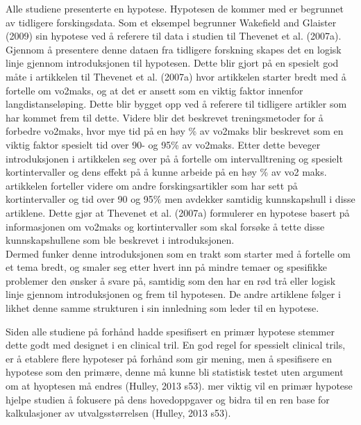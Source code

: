 \documentclass[
]{article}
\begin{document}
Alle studiene presenterte en hypotese. Hypotesen de kommer med er
begrunnet av tidligere forskingsdata. Som et eksempel begrunner
Wakefield and Glaister (2009) sin hypotese ved å referere til data i
studien til Thevenet et al. (2007a). Gjennom å presentere denne dataen
fra tidligere forskning skapes det en logisk linje gjennom
introduksjonen til hypotesen. Dette blir gjort på en spesielt god måte i
artikkelen til Thevenet et al. (2007a) hvor artikkelen starter bredt med
å fortelle om vo2maks, og at det er ansett som en viktig faktor innenfor
langdistanseløping. Dette blir bygget opp ved å referere til tidligere
artikler som har kommet frem til dette. Videre blir det beskrevet
treningsmetoder for å forbedre vo2maks, hvor mye tid på en høy \% av
vo2maks blir beskrevet som en viktig faktor spesielt tid over 90- og
95\% av vo2maks. Etter dette beveger introduksjonen i artikkelen seg
over på å fortelle om intervalltrening og spesielt kortintervaller og
dens effekt på å kunne arbeide på en høy \% av vo2 maks. artikkelen
forteller videre om andre forskingsartikler som har sett på
kortintervaller og tid over 90 og 95\% men avdekker samtidig
kunnskapshull i disse artiklene. Dette gjør at Thevenet et al. (2007a)
formulerer en hypotese basert på informasjonen om vo2maks og
kortintervaller som skal forsøke å tette disse kunnskapshullene som ble
beskrevet i introduksjonen.\\
Dermed funker denne introduksjonen som en trakt som starter med å
fortelle om et tema bredt, og smaler seg etter hvert inn på mindre
temaer og spesifikke problemer den ønsker å svare på, samtidig som den
har en rød trå eller logisk linje gjennom introduksjonen og frem til
hypotesen. De andre artiklene følger i likhet denne samme strukturen i
sin innledning som leder til en hypotese.

Siden alle studiene på forhånd hadde spesifisert en primær hypotese
stemmer dette godt med designet i en clinical tril. En god regel for
spessielt clinical trils, er å etablere flere hypoteser på forhånd som
gir mening, men å spesifisere en hypotese som den primære, denne må
kunne bli statistisk testet uten argument om at hyoptesen må endres
(Hulley, 2013 s53). mer viktig vil en primær hypotese hjelpe studien å
fokusere på dens hovedoppgaver og bidra til en ren base for
kalkulasjoner av utvalgsstørrelsen (Hulley, 2013 s53).
\end{document}
